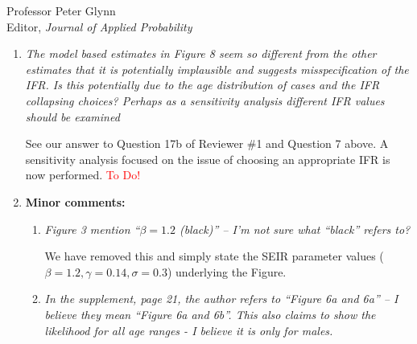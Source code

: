 \documentclass[11pt]{letter} %
\begin{document}
\begin{letter}{Professor
	Peter Glynn\\
	Editor, {\em Journal of Applied Probability}}
\begin{enumerate}
\vspace{5mm}
We have fixed Figure 3b to match on covariates and have matching y-axes.  See our answer to Question 16b from Reviewer \#1 on additional figures we are including in the revision.
\textcolor{red}{Need to do.}
\vspace{5mm}
\item {\it The model based estimates in Figure 8 seem so different from the other estimates that it is potentially implausible and suggests misspecification of the IFR. Is this potentially due to the age distribution of cases and the IFR collapsing choices? Perhaps as a sensitivity analysis different IFR values should be examined}

\vspace{5mm}
See our answer to Question 17b of Reviewer \#1 and Question 7 above. A sensitivity analysis focused on the issue of choosing an appropriate IFR is now performed.
\textcolor{red}{To Do!}
\vspace{5mm}
\item {\bf Minor comments:}
	\begin{enumerate}
		\item {\it Figure 3 mention “$\beta = 1.2$ (black)” – I’m not sure what “black” refers to?}
		\vspace{5mm}

		We have removed this and simply state the SEIR parameter values ($\beta = 1.2, \gamma = 0.14, \sigma = 0.3$) underlying the Figure.

		\item {\it In the supplement, page 21, the author refers to “Figure 6a and 6a” – I believe they mean “Figure 6a and 6b”. This also claims to show the likelihood for all age ranges - I believe it is only for males.}
	\end{enumerate}
\end{enumerate}

\end{letter}
\end{document}
